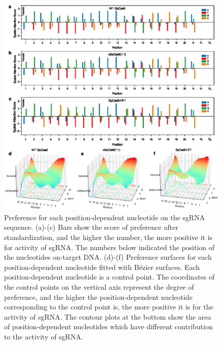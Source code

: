 \documentclass{bioinfo}
\begin{document}
\begin{figure}[!tpb]
    \centerline{\includegraphics[width=178mm]{spatialattention.eps}}
    \caption{Preference for each position-dependent nucleotide on the sgRNA sequence. 
(a)-(c) Bars show the score of preference after standardization, and the higher the number, the more positive it is for activity of sgRNA. 
The numbers below indicated the position of the nucleotides on-target DNA. 
(d)-(f) Preference surfaces for each position-dependent nucleotide fitted with Bézier surfaces. 
Each position-dependent nucleotide is a control point. 
The coordinates of the control points on the vertical axis represent the degree of preference, 
and the higher the position-dependent nucleotide corresponding to the control point is, the more positive it is for the activity of sgRNA.
The contour plots at the bottom show the area of position-dependent nucleotides which have different contribution to the activity of sgRNA. 
}\label{fig:spatialattention}
\end{figure}
\end{document}
